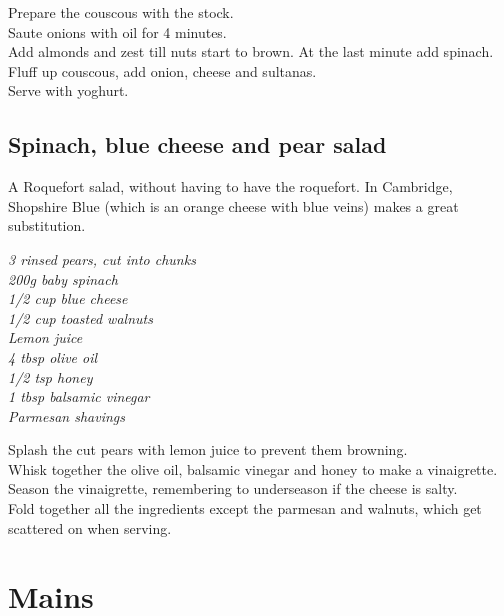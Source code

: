 \documentclass{tufte-book}
\begin{document}
\smallskip
Prepare the couscous with the stock.
\\Saute onions with oil for 4 minutes.
\\Add almonds and zest till nuts start to brown. At the last minute add spinach.
\\Fluff up couscous, add onion, cheese and sultanas.
\\Serve with yoghurt.



\section{Spinach, blue cheese and pear salad}

A Roquefort salad, without having to have the roquefort. In Cambridge, Shopshire Blue (which is an orange cheese with blue veins) makes a great substitution.

\smallskip
\emph{3 rinsed pears, cut into chunks
\\200g baby spinach
\\1/2 cup blue cheese
\\1/2 cup toasted walnuts
\\Lemon juice
\\4 tbsp olive oil
\\1/2 tsp honey
\\1 tbsp balsamic vinegar
\\Parmesan shavings
}

\smallskip
Splash the cut pears with lemon juice to prevent them browning.
\\Whisk together the olive oil, balsamic vinegar and honey to make a vinaigrette.
\\Season the vinaigrette, remembering to underseason if the cheese is salty.
\\Fold together all the ingredients except the parmesan and walnuts, which get scattered on when serving.

\chapter{Mains}
\end{document}
